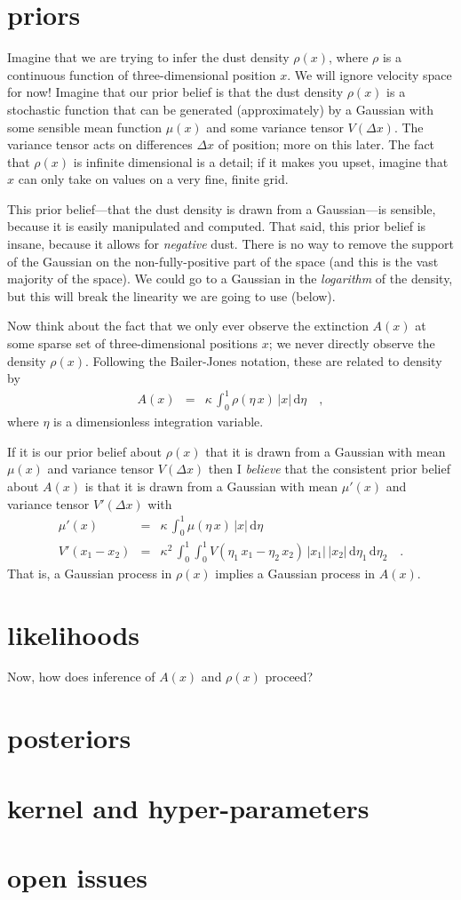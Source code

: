 \documentclass[12pt, letterpaper]{article}
\newcommand{\dd}{\mathrm{d}}
\begin{document}
\section{priors}

Imagine that we are trying to infer the dust density $\rho(x)$, where
$\rho$ is a continuous function of three-dimensional position $x$.
We will ignore velocity space for now!
Imagine that our prior belief is that the dust density $\rho(x)$ is a
stochastic function that can be generated (approximately) by a
Gaussian with some sensible mean function $\mu(x)$ and some variance
tensor $V(\Delta x)$.
The variance tensor acts on differences $\Delta x$ of position; more
on this later.
The fact that $\rho(x)$ is infinite dimensional is a detail; if it
makes you upset, imagine that $x$ can only take on values on a very
fine, finite grid.

This prior belief---that the dust density is drawn from a
Gaussian---is sensible, because it is easily manipulated and computed.
That said, this prior belief is insane, because it allows for
\emph{negative} dust.
There is no way to remove the support of the Gaussian on the
non-fully-positive part of the space (and this is the vast majority of
the space).
We could go to a Gaussian in the \emph{logarithm} of the density, but
this will break the linearity we are going to use (below).

Now think about the fact that we only ever observe the extinction
$A(x)$ at some sparse set of three-dimensional positions $x$; we never
directly observe the density $\rho(x)$.
Following the Bailer-Jones notation, these are related to density by
\begin{eqnarray}
A(x) &=& \kappa\,\int_0^1 \rho(\eta\,x)\,|x|\,\dd\eta
\quad,
\end{eqnarray}
where $\eta$ is a dimensionless integration variable.

If it is our prior belief about $\rho(x)$ that it is drawn from a
Gaussian with mean $\mu(x)$ and variance tensor $V(\Delta x)$ then I
\emph{believe} that the consistent prior belief about $A(x)$ is that
it is drawn from a Gaussian with mean $\mu'(x)$ and variance tensor
$V'(\Delta x)$ with
\begin{eqnarray}
\mu'(x) &=& \kappa\,\int_0^1 \mu(\eta\,x)\,|x|\,\dd\eta
\\
V'(x_1 - x_2) &=& \kappa^2\,\int_0^1\int_0^1 V(\eta_1\,x_1 - \eta_2\,x_2)\,|x_1|\,|x_2|\,\dd\eta_1\,\dd\eta_2
\quad .
\end{eqnarray}
That is, a Gaussian process in $\rho(x)$ implies a Gaussian process in
$A(x)$.

\section{likelihoods}

Now, how does inference of $A(x)$ and $\rho(x)$ proceed?

\section{posteriors}

\section{kernel and hyper-parameters}

\section{open issues}
\end{document}
